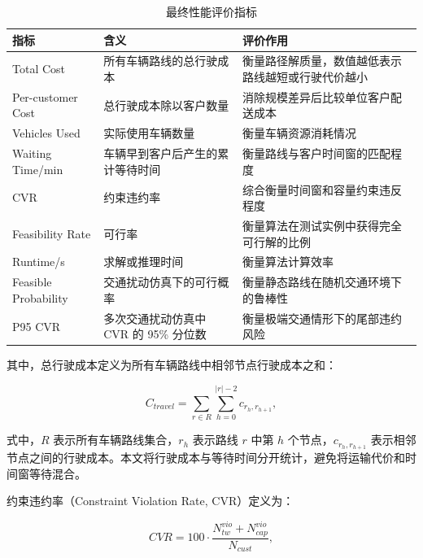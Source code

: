 \documentclass[12pt,a4paper,UTF8]{article}
\begin{document}
\begin{table}[!htbp]
    \centering
    \caption{最终性能评价指标}
    \label{tab:final_metrics}
    \small
    \begin{tabularx}{\textwidth}{p{3.5cm} p{4.4cm} X}
        \toprule
        指标 & 含义 & 评价作用 \\
        \midrule
        Total Cost & 所有车辆路线的总行驶成本 & 衡量路径解质量，数值越低表示路线越短或行驶代价越小 \\
        Per-customer Cost & 总行驶成本除以客户数量 & 消除规模差异后比较单位客户配送成本 \\
        Vehicles Used & 实际使用车辆数量 & 衡量车辆资源消耗情况 \\
        Waiting Time/min & 车辆早到客户后产生的累计等待时间 & 衡量路线与客户时间窗的匹配程度 \\
        CVR & 约束违约率 & 综合衡量时间窗和容量约束违反程度 \\
        Feasibility Rate & 可行率 & 衡量算法在测试实例中获得完全可行解的比例 \\
        Runtime/s & 求解或推理时间 & 衡量算法计算效率 \\
        Feasible Probability & 交通扰动仿真下的可行概率 & 衡量静态路线在随机交通环境下的鲁棒性 \\
        P95 CVR & 多次交通扰动仿真中 CVR 的 95\% 分位数 & 衡量极端交通情形下的尾部违约风险 \\
        \bottomrule
    \end{tabularx}
\end{table}

其中，总行驶成本定义为所有车辆路线中相邻节点行驶成本之和：

\begin{equation}
    C_{travel}
    =
    \sum_{r\in R}
    \sum_{h=0}^{|r|-2}
    c_{r_h,r_{h+1}},
    \label{eq:metric_total_cost}
\end{equation}

式中，$R$ 表示所有车辆路线集合，$r_h$ 表示路线 $r$ 中第 $h$ 个节点，$c_{r_h,r_{h+1}}$ 表示相邻节点之间的行驶成本。本文将行驶成本与等待时间分开统计，避免将运输代价和时间窗等待混合。

约束违约率（Constraint Violation Rate, CVR）定义为：

\begin{equation}
    CVR
    =
    100
    \cdot
    \frac{
        N_{tw}^{vio}+N_{cap}^{vio}
    }{
        N_{cust}
    },
    \label{eq:metric_cvr_simple}
\end{equation}
\end{document}
